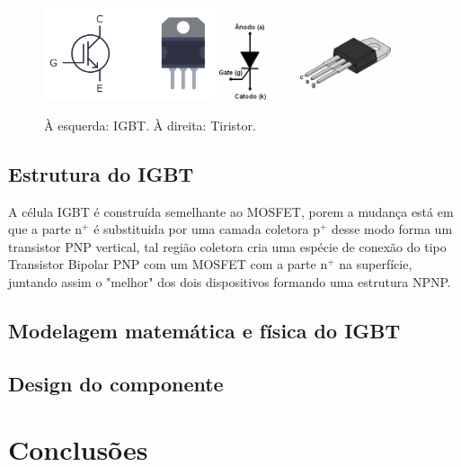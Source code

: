\documentclass[12pt]{article}
\begin{document}
        \begin{figure}[H]
            \centering
            \includegraphics[width=0.45\textwidth]{./images/IGBT.png}
            \includegraphics[width=0.45\textwidth]{./images/tiristor.png}
        \caption{À esquerda: IGBT. À direita: Tiristor.}
        \end{figure}
        \subsection{Estrutura do IGBT}

        A célula IGBT é construída semelhante ao MOSFET, porem a mudança está em que a parte n${^+}$ é substituida por uma camada coletora p${^+}$ desse modo forma um transistor PNP vertical, tal região coletora cria uma espécie de conexão do tipo Transistor Bipolar PNP com um MOSFET com a parte n${^+}$ na superfície, juntando assim o "melhor" dos dois dispositivos formando uma estrutura NPNP.

        \subsection{Modelagem matemática e física do IGBT}
        \subsection{Design do componente}
        \subsection{}
        \subsection{}

\section{Conclusões}
\end{document}
